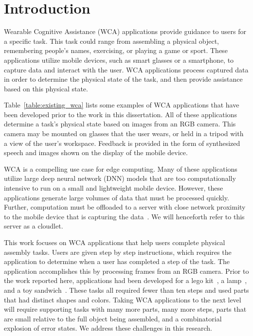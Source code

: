 \chapter{Introduction}\label{chap:intro}

Wearable Cognitive Assistance (WCA) applications provide guidance to users for
a specific task.
This task could range from assembling a physical object, remembering people's
names, exercising, or playing a game or sport.
These applications
utilize mobile devices, such as smart glasses or a smartphone, to capture data
and interact with the user.
WCA applications process captured data in order to determine the physical state
of the task, and then provide assistance based on this physical state.

Table~{\ref{table:existing_wca}} lists some examples of WCA applications that
have been developed prior to the work in this dissertation.
All of these applications determine a task's physical state based on images from
an RGB camera.
This camera may be mounted on glasses that the user wears, or held in a tripod
with a view of the user's workspace.
Feedback is provided in the form of synthesized speech and images shown on the
display of the mobile device.

WCA is a compelling use case for edge computing. Many of these applications
utilize large deep neural network (DNN) models that are too computationally
intensive to run on a small and lightweight mobile device. However, these
applications generate large volumes of data that must be processed quickly.
Further, computation must be offloaded to a server with close network
proximity to the mobile device that is capturing the data~\cite{satya14}. We
will henceforth refer to this server as a cloudlet.

This work focuses on WCA applications that help users complete physical
assembly tasks.
Users are given step by step instructions, which requires the application to
determine when a user has completed a step of the task.
The application accomplishes this by processing frames from an RGB camera.
Prior to the work reported here, applications had been developed for a lego
kit~{\cite{lego}}, a lamp~{\cite{lamp}}, and a toy sandwich~{\cite{sandwich}}.
These tasks all required fewer than ten steps and
used parts that had distinct shapes and colors.
Taking WCA applications to the next level will require supporting tasks with
many more parts, many more steps, parts that are small relative to the full
object being assembled, and a combinatorial explosion of error states.
We address these challenges in this research.

